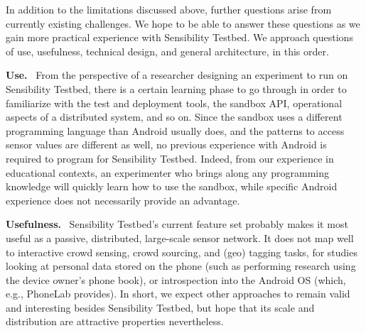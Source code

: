 In addition to the limitations discussed above, further questions 
arise from currently existing challenges. We hope to be able to 
answer these questions as we gain more practical experience with 
Sensibility Testbed.  
We approach questions of use, usefulness, technical design, and
general architecture, in this order.


\textbf{Use.}~
From the perspective of a researcher designing an experiment to 
run on Sensibility Testbed, there is a certain learning phase 
to go through in order to familiarize with the test and deployment 
tools, the sandbox API, operational aspects of a distributed system, 
and so on. Since the sandbox uses a different programming language 
than Android usually does, and the patterns to access sensor values 
are different as well, no previous experience with Android is required 
to program for Sensibility Testbed. Indeed, from our experience in 
educational contexts, an experimenter who brings along any programming 
knowledge will quickly learn how to use the sandbox, while specific 
Android experience does not necessarily provide an advantage.


\textbf{Usefulness.}~
Sensibility Testbed's current feature set probably makes it most 
useful as a passive, distributed, large-scale sensor network. 
It does not map well to interactive crowd sensing, crowd sourcing, 
and (geo) tagging tasks, for studies looking at personal data stored 
on the phone (such as performing research using the device owner's 
phone book),
or introspection into the Android OS (which, e.g., PhoneLab provides). 
In short, we expect other approaches to remain valid and interesting 
besides Sensibility Testbed, but hope that its scale and distribution 
are attractive properties nevertheless.


